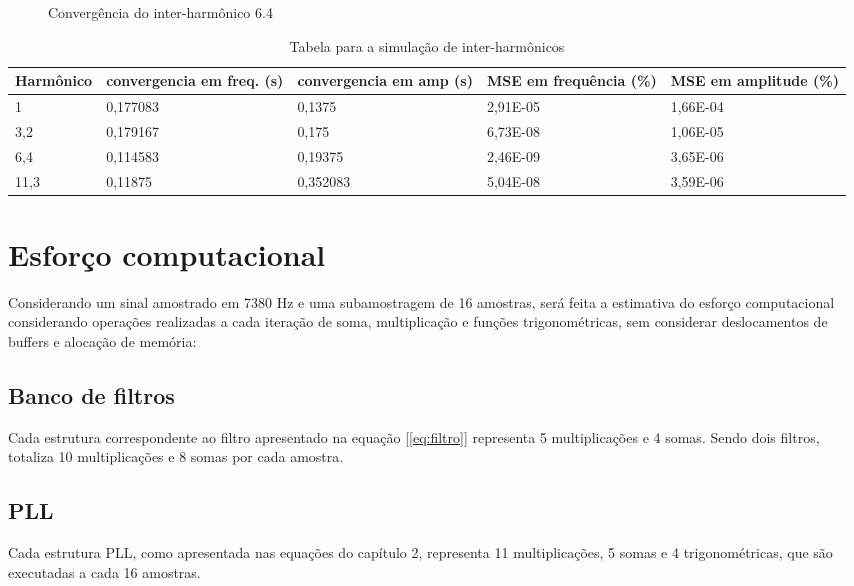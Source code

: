 \begin{figure}[H]
	\centering    
	\def\svgscale{1}
	
	\caption{Convergência do inter-harmônico 6.4}
	\label{fig:esquema_pll}
\end{figure}

\begin{table}[H]
	\centering
	\begin{tabular}{|p{2.5cm}|p{2.5cm}|p{2.5cm}|p{2.5cm}|p{2.5cm}|}
		\hline
		Harmônico & convergencia em freq. (s)& convergencia em amp (s) & MSE em frequência (\%) & MSE em amplitude (\%)\\
		\hline
		1    & 0,177083 & 0,1375   & 2,91E-05 & 1,66E-04 \\
		3,2  & 0,179167 & 0,175    & 6,73E-08 & 1,06E-05 \\
		6,4  & 0,114583 & 0,19375  & 2,46E-09 & 3,65E-06 \\
		11,3 & 0,11875  & 0,352083 & 5,04E-08 & 3,59E-06 \\
		\hline
	\end{tabular}
	\caption{Tabela para a simulação de inter-harmônicos}
\end{table}


\section{Esforço computacional}

\indent Considerando um sinal amostrado em 7380  Hz e uma subamostragem de 16 amostras, será feita a estimativa do esforço computacional considerando operações realizadas a cada iteração de soma, multiplicação e funções trigonométricas, sem considerar deslocamentos de buffers e alocação de memória:

\subsection{Banco de filtros}

\indent Cada estrutura correspondente ao filtro apresentado na equação [\ref{eq:filtro}] representa 5 multiplicações e 4 somas. Sendo dois filtros, totaliza 10 multiplicações e 8 somas por cada amostra.

\subsection{PLL}

\indent Cada estrutura PLL, como apresentada nas equações do capítulo 2, representa 11 multiplicações, 5 somas e 4 trigonométricas, que são executadas a cada 16 amostras. 

